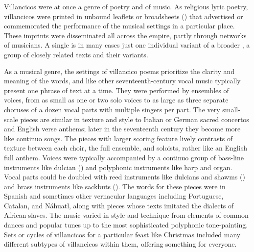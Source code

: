 
Villancicos were at once a genre of poetry and of music.
As religious lyric poetry, villancicos were printed in unbound leaflets or
broadsheets () that advertised or commemorated the
performance of the musical settings in a particular place.%
    \Autocite{LopezLorenzo:VC-Sevillano}
These imprints were disseminated all across the empire, partly through networks
of musicians.
A single  is in many cases just one individual variant of
a broader , a group of closely related texts and their
variants.


As a musical genre, the settings of villancico poems prioritize the clarity and
meaning of the words, and like other seventeenth-century vocal music typically
present one phrase of text at a time.
They were performed by ensembles of voices, from as small as one or two solo
voices to as large as three separate choruses of a dozen vocal parts with
multiple singers per part.
The very small-scale pieces are similar in texture and style to Italian or
German sacred concertos and English verse anthems; later in the seventeenth
century they become more like continuo songs.%
    \Autocite{Kendrick:SacredSongs}
The pieces with larger scoring feature lively contrasts of texture between each
choir, the full ensemble, and soloists, rather like an English full anthem.
Voices were typically accompanied by a continuo group of bass-line instruments
like dulcian () and polyphonic instruments like harp and organ.
Vocal parts could be doubled with reed instruments like dulcians and shawms
() and brass instruments like sackbuts ().
The words for these pieces were in Spanish and sometimes other vernacular
languages including Portuguese, Catalan, and Náhuatl, along with pieces whose
texts imitated the dialects of African slaves.
The music varied in style and technique from elements of common dances
and popular tunes up to the most sophisticated polyphonic tone-painting.
Sets or cycles of villancicos for a particular feast like Christmas included
many different subtypes of villancicos within them, offering something for
everyone.


